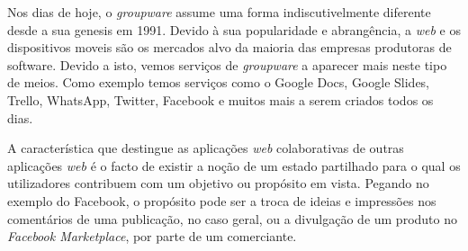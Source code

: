 \documentclass[runningheads]{llncs}
\begin{document}
        Nos dias de hoje, o {\itshape groupware} assume uma forma
        indiscutivelmente diferente desde a sua genesis em 1991. Devido à sua
        popularidade e abrangência, a {\itshape web} e os dispositivos moveis
        são os mercados alvo da maioria das empresas produtoras de software.
        Devido a isto, vemos serviços de {\itshape groupware} a aparecer mais
        neste tipo de meios. Como exemplo temos serviços como o Google Docs,
        Google Slides, Trello, WhatsApp, Twitter, Facebook e muitos mais a serem
        criados todos os dias. 

        A característica que destingue as aplicações {\itshape web}
        colaborativas de outras aplicações {\itshape web} é o facto de existir a
        noção de um estado partilhado para o qual os utilizadores contribuem com
        um objetivo ou propósito em vista. Pegando no exemplo do Facebook, o
        propósito pode ser a troca de ideias e impressões nos comentários de uma
        publicação, no caso geral, ou a divulgação de um produto no {\itshape
        Facebook Marketplace}, por parte de um comerciante.



\end{document}

